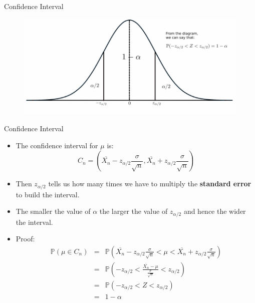 \documentclass[handout]{beamer}
\begin{document}
\begin{frame}{Confidence Interval}


\begin{figure}[h!]
	\centering
	\includegraphics[scale=0.8]{pics/conf_int_3.pdf}
\end{figure}


 
\end{frame}


\begin{frame}{Confidence Interval}
\scriptsize{
\begin{itemize}
 \item  The confidence interval for $\mu$ is:
 \begin{displaymath}
 C_n = (\overline{X_{n}}-z_{\alpha/2}\frac{\sigma}{\sqrt{n}} , \overline{X_{n}} + z_{\alpha/2}\frac{\sigma}{\sqrt{n}}) 
 \end{displaymath}
\item Then $ z_{\alpha/2}$ tells us how many times we have to multiply the \textbf{standard error} to build the interval.
\item The smaller the value of $\alpha$ the larger the value of $ z_{\alpha/2}$ and hence the wider the interval.  
\item Proof:
 \begin{eqnarray*}
 \mathbb{P}(\mu \in C_n) & = & \mathbb{P}(\overline{X_{n}}-z_{\alpha/2}\frac{\sigma}{\sqrt{n}} < \mu < \overline{X_{n}} + z_{\alpha/2}\frac{\sigma}{\sqrt{n}}) \nonumber \\ 
                         & = & \mathbb{P}(-z_{\alpha/2} < \frac{\overline{X_{n}}-\mu}{\frac{\sigma}{\sqrt{n}}} <  z_{\alpha/2}) \nonumber \\ 
			  & = & \mathbb{P}(-z_{\alpha/2} < Z <  z_{\alpha/2}) \nonumber \\
			   & = & 1-\alpha 
 \end{eqnarray*}


\end{itemize}
}


 
\end{frame}
\end{document}
